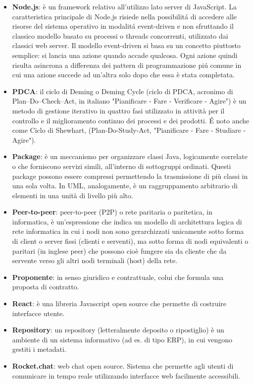 \begin{itemize}
\item[] \textbf{Node.js}: è un framework relativo all'utilizzo lato server di JavaScript. La caratteristica principale di Node.js risiede nella possibilit\'a di accedere alle risorse del sistema operativo in modalit\'a event-driven e non sfruttando il classico modello basato su processi o threads concorrenti, utilizzato dai classici web server. Il modello event-driven si basa su un concetto piuttosto semplice: si lancia una azione quando accade qualcosa. Ogni azione quindi risulta asincrona a differenza dei pattern di programmazione pi\'u comune in cui una azione succede ad un'altra solo dopo che essa è stata completata.
\end{itemize}
\newpage

\begin{itemize}
\item[] \textbf{PDCA}: il ciclo di Deming o Deming Cycle (ciclo di PDCA, acronimo di Plan–Do–Check–Act, in italiano "Pianificare - Fare - Verificare - Agire") è un metodo di gestione iterativo in quattro fasi utilizzato in attività per il controllo e il miglioramento continuo dei processi e dei prodotti. \'E noto anche come Ciclo di Shewhart, (Plan-Do-Study-Act, "Pianificare - Fare - Studiare - Agire").
\item[] \textbf{Package}: è un meccanismo per organizzare classi Java, logicamente correlate o che forniscono servizi simili, all'interno di sottogruppi ordinati. Questi package possono essere compressi permettendo la trasmissione di più classi in una sola volta. In UML, analogamente, è un raggruppamento arbitrario di elementi in una unità di livello più alto.
\item[] \textbf{Peer-to-peer}: peer-to-peer (P2P) o rete paritaria o paritetica, in informatica, è un'espressione che indica un modello di architettura logica di rete informatica in cui i nodi non sono gerarchizzati unicamente sotto forma di client o server fissi (clienti e serventi), ma sotto forma di nodi equivalenti o paritari (in inglese peer) che possono cioè fungere sia da cliente che da servente verso gli altri nodi terminali (host) della rete.
\item[] \textbf{Proponente}: in senso giuridico e contrattuale, colui che formula una proposta di contratto.
\end{itemize}
\newpage

\begin{itemize}
\item[] \textbf{React}: è una libreria Javascript open source che permette di costruire interfacce utente.
\item[] \textbf{Repository}: un repository (letteralmente deposito o ripostiglio) è un ambiente di un sistema informativo (ad es. di tipo ERP), in cui vengono gestiti i metadati.
\item[] \textbf{Rocket.chat}: web chat open source. Sistema che permette agli utenti di comunicare in tempo reale utilizzando interfacce web facilmente accessibili.
\end{itemize}
\newpage

